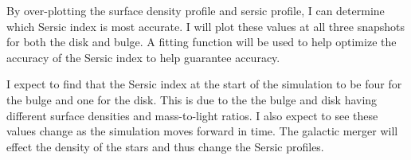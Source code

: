 \documentclass[linenumbers,trackchanges]{aastex7}
\begin{document}
By over-plotting the surface density profile and sersic profile, I
can determine which Sersic index is most accurate. I will plot these
values at all three snapshots for both the disk and bulge. A fitting
function will be used to help optimize the accuracy of the Sersic
index to help guarantee accuracy.

I expect to find that the Sersic index at the start of the simulation
to be four for the bulge and one for the disk. This is due to the the
bulge and disk having different surface densities and mass-to-light
ratios. I also expect to see these values change as the simulation
moves forward in time. The galactic merger will effect the density of
the stars and thus change the Sersic profiles.


{}



\end{document}
